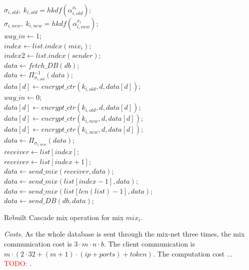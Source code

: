 \documentclass[USenglish,oneside,twocolumn]{article}
\newcommand{\todo}[1]{\textcolor{red}{TODO: #1}}
\begin{document}
\begin{algorithm}
\DontPrintSemicolon
{}
$\sigma_{i,old},\ k_{i,old}=hkdf(\alpha_{i,old}^{x_i})$;\\
$\sigma_{i,new},\ k_{i,new}=hkdf(\alpha_{i, new}^{x_i})$;\\
$way\_in \gets 1$;\\
$index \gets list.index(mix_i)$;\\
$index2 \gets list.index(sender)$;\\
{
{
$data \gets fetch\_DB(db)$;\\
}
$data \gets \Pi_{\sigma_{i,old}}^{-1}(data)$;\\
{
	$data[d] \gets encrypt\_ctr(k_{i,old}, d, data[d])$;\\
}
}
\Else
{
$way\_in\gets 0$;\\
{
{
	$data[d] \gets encrypt\_ctr(k_{i,old}, d, data[d])$;\\
    $data[d] \gets encrypt\_ctr(k_{i,new}, d, data[d])$;\\
}
}
\Else
{
{
$data[d] \gets encrypt\_ctr(k_{i,new}, d, data[d])$;\\
}
$data \gets \Pi_{\sigma_{i,new}}(data)$;\\
}
}
{
$receiver \gets list[index]$;\\
{
$receiver \gets list[index+1]$;\\
}
$data \gets send\_mix(receiver, data)$;\\
}
\Else
{
{
$data \gets send\_mix(list[index-1], data)$;\\
}
\Else
{
{
$data \gets send\_mix(list[len(list)-1], data)$;\\
}
\Else
{
$data \gets send\_DB(db, data)$;\\
}
}
}
\caption{Rebuilt Cascade mix operation for mix $mix_i$.}
\label{alg:CIL}
\end{algorithm}

\noindent\textit{Costs.}
As the whole database is sent through the mix-net three times, the mix communication cost is $3\cdot m \cdot n \cdot b$. The client communication is $m \cdot (2 \cdot 32+ (m+1)\cdot (ip +ports)+ token)$.
The  computation cost ... \todo{}.\\
\end{document}
